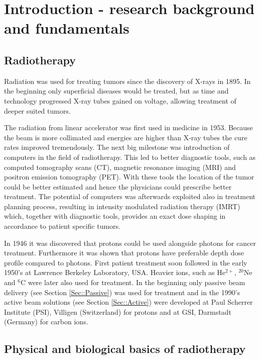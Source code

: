 \documentclass[type=dr, dr=rernat, accentcolor=tud7b,colorbacktitle, bigchapter, openright, twoside, 12pt ]{tudthesis}
\begin{document}
\chapter{Introduction - research background and fundamentals}
\label{chapter:intro}
\minitoc

\section{Radiotherapy}

Radiation was used for treating tumors since the discovery of X-rays in 1895. In the beginning only superficial diseases would be treated, but as time and technology progressed X-ray tubes gained on voltage, allowing treatment of deeper suited tumors.

The radiation from linear accelerator was first used in medicine in 1953. Because the beam is more collimated and energies are
higher than X-ray tubes the cure rates improved tremendously. The next big milestone was introduction of computers in the field
of radiotherapy. This led to better diagnostic tools, such as computed tomography scans (CT), magnetic resonance imaging (MRI) and
positron emission tomography (PET). With these tools the location of the tumor could be better estimated and hence the physicians
could prescribe better treatment. The potential of computers was afterwards exploited also in treatment planning process, resulting in intensity modulated
radiation therapy (IMRT) which, together with diagnostic tools, provides an exact dose shaping in accordance to patient specific tumors.

In 1946 it was discovered that protons could be used alongside photons for cancer treatment. Furthermore it was shown that protons have preferable depth dose profile compared to photons. First patient treatment soon followed in the early 1950's at Lawrence Berkeley Laboratory, USA. Heavier ions, such as 
He$^{2+}$, $^{20}$Ne and $^6$C were later also used for treatment. In the beginning only passive beam delivery (see Section \ref{Sec::Passive}) was used for treatment and in the 1990's active beam solutions (see Section \ref{Sec::Active}) were developed at Paul Scherrer Institute (PSI), Villigen (Switzerland) for protons and at GSI, Darmstadt (Germany) for carbon ions.


\section{Physical and biological basics of radiotherapy}
\end{document}
